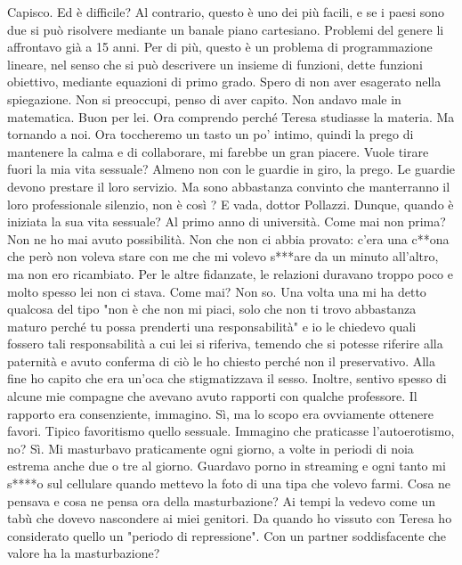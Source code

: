 \documentclass[a4paper,12pt]{article}
\newcommand{\Walter}{\speak{W}}
\newcommand{\Pollazzi}{\speak{P}}
\begin{document}
\begin{dialogue}
\Pollazzi  Capisco. Ed è difficile?
\Walter  Al contrario, questo è uno dei più facili, e se i paesi sono due si può risolvere mediante un banale piano cartesiano. Problemi del genere li affrontavo già a 15 anni. Per di più, questo è un problema di programmazione lineare, nel senso che si può descrivere un insieme di funzioni, dette funzioni obiettivo, mediante equazioni di primo grado. Spero di non aver esagerato nella spiegazione.
\Pollazzi  Non si preoccupi, penso di aver capito. Non andavo male in matematica.
\Walter  Buon per lei.
\Pollazzi  Ora comprendo perché Teresa studiasse la materia. Ma tornando a noi. Ora toccheremo un tasto un po' intimo, quindi la prego di mantenere la calma e di collaborare,
mi farebbe un gran piacere.
\Walter  Vuole tirare fuori la mia vita sessuale? Almeno non con le guardie in giro, la prego.
\Pollazzi  Le guardie devono prestare il loro servizio. Ma sono abbastanza convinto che manterranno il loro professionale silenzio, non è così ?
\Walter  E vada, dottor Pollazzi.
\Pollazzi  Dunque, quando è iniziata la sua vita sessuale?
\Walter  Al primo anno di università.
\Pollazzi  Come mai non prima?
\Walter  Non ne ho mai avuto possibilità. Non che non ci abbia provato: c'era una c**ona che però non voleva stare con me che mi volevo s***are da un minuto all'altro, ma non ero ricambiato. Per le altre fidanzate, le relazioni duravano troppo poco e molto spesso lei non ci stava.
\Pollazzi  Come mai?
\Walter  Non so. Una volta una mi ha detto qualcosa del tipo "non è che non mi piaci, solo che non ti trovo abbastanza maturo perché tu possa prenderti una responsabilità" e io le chiedevo quali fossero tali responsabilità a cui lei si riferiva, temendo che si potesse riferire alla paternità e avuto conferma di ciò le ho chiesto perché non il preservativo. Alla fine ho capito che era un'oca che stigmatizzava il sesso. Inoltre, sentivo spesso di alcune mie compagne che avevano avuto rapporti con qualche professore.
\Pollazzi  Il rapporto era consenziente, immagino.
\Walter  Sì, ma lo scopo era ovviamente ottenere favori. Tipico favoritismo quello sessuale.
\Pollazzi  Immagino che praticasse l'autoerotismo, no?
\Walter  Sì. Mi masturbavo praticamente ogni giorno, a volte in periodi di noia estrema anche due o tre al giorno. Guardavo porno in streaming e ogni tanto mi s****o sul cellulare quando mettevo la foto di una tipa che volevo farmi.
\Pollazzi  Cosa ne pensava e cosa ne pensa ora della masturbazione?
\Walter  Ai tempi la vedevo come un tabù che dovevo nascondere ai miei genitori. Da quando ho vissuto con Teresa ho considerato quello un "periodo di repressione". Con un partner soddisfacente che valore ha la masturbazione?

\end{dialogue}
\end{document}
